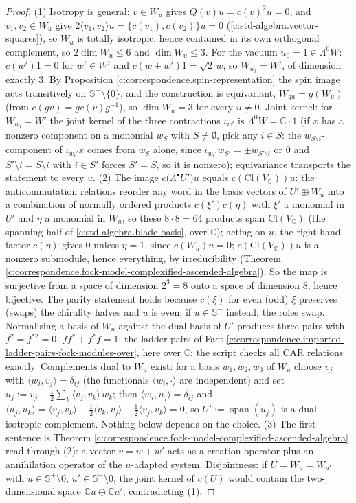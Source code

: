 \documentclass[11pt]{article}
\theoremstyle{definition}
\theoremstyle{plain}
\providecommand{\C}{}\renewcommand{\C}{\mathbb{C}}
\providecommand{\CS}{}\renewcommand{\CS}{{\mathbb{S}^{+}}}
\providecommand{\CSm}{}\renewcommand{\CSm}{{\mathbb{S}^{-}}}
\providecommand{\Cl}{}\renewcommand{\Cl}{\mathrm{Cl}}
\providecommand{\ip}{}\renewcommand{\ip}[2]{\langle #1, #2\rangle}
\begin{document}
\begin{proof}
(1) Isotropy is general: $v \in W_u$ gives $Q(v)u = c(v)^2u = 0$, and $v_1, v_2 \in W_u$ give $2\ip{v_1}{v_2}u = \{c(v_1), c(v_2)\}u = 0$ (\ref{c:std-algebra.vector-squares}), so $W_u$ is totally isotropic, hence contained in its own orthogonal complement, so $2\dim W_u \le 6$ and $\dim W_u \le 3$. For the vacuum $u_0 = 1 \in \Lambda^0 W$: $c(w')1 = 0$ for $w' \in W'$ and $c(w+w')1 = \sqrt2\,w$, so $W_{u_0} = W'$, of dimension exactly $3$. By Proposition \ref{c:correspondence.spin-representation} the spin image acts transitively on $\CS\setminus\{0\}$, and the construction is equivariant, $W_{gu} = g(W_u)$ (from $c(gv) = g c(v) g^{-1}$), so $\dim W_u = 3$ for every $u \neq 0$. Joint kernel: for $W_{u_0} = W'$ the joint kernel of the three contractions $\iota_{w'}$ is $\Lambda^0 W = \C\cdot 1$ (if $x$ has a nonzero component on a monomial $w_S$ with $S \neq \emptyset$, pick any $i \in S$: the $w_{S\setminus i}$-component of $\iota_{w_i'}x$ comes from $w_S$ alone, since $\iota_{w_i'}w_{S'} = \pm w_{S'\setminus i}$ or $0$ and $S'\setminus i = S\setminus i$ with $i \in S'$ forces $S' = S$, so it is nonzero); equivariance transports the statement to every $u$.
(2) The image $c\bigl(\Lambda^\bullet U'\bigr)u$ equals $c(\Cl(V_\C))u$: the anticommutation relations reorder any word in the basis vectors of $U' \oplus W_u$ into a combination of normally ordered products $c(\xi')c(\eta)$ with $\xi'$ a monomial in $U'$ and $\eta$ a monomial in $W_u$, so these $8\cdot 8 = 64$ products span $\Cl(V_\C)$ (the spanning half of \ref{c:std-algebra.blade-basis}, over $\C$); acting on $u$, the right-hand factor $c(\eta)$ gives $0$ unless $\eta = 1$, since $c(W_u)u = 0$; $c(\Cl(V_\C))u$ is a nonzero submodule, hence everything, by irreducibility (Theorem \ref{c:correspondence.fock-model-complexified-ascended-algebra}). So the map is surjective from a space of dimension $2^3 = 8$ onto a space of dimension $8$, hence bijective. The parity statement holds because $c(\xi)$ for even (odd) $\xi$ preserves (swaps) the chirality halves and $u$ is even; if $u \in \CSm$ instead, the roles swap. Normalising a basis of $W_u$ against the dual basis of $U'$ produces three pairs with $f^2 = f^{*2} = 0$, $ff^* + f^*f = 1$: the ladder pairs of Fact \ref{c:correspondence.imported-ladder-pairs-fock-modules-over}, here over $\C$; the script checks all CAR relations exactly. Complements dual to $W_u$ exist: for a basis $w_1, w_2, w_3$ of $W_u$ choose $v_j$ with $\ip{w_i}{v_j} = \delta_{ij}$ (the functionals $\ip{w_i}{\cdot}$ are independent) and set $u_j := v_j - \tfrac12\sum_k \ip{v_j}{v_k}\,w_k$; then $\ip{w_i}{u_j} = \delta_{ij}$ and $\ip{u_j}{u_k} = \ip{v_j}{v_k} - \tfrac12\ip{v_k}{v_j} - \tfrac12\ip{v_j}{v_k} = 0$, so $U' := \operatorname{span}(u_j)$ is a dual isotropic complement. Nothing below depends on the choice.
(3) The first sentence is Theorem \ref{c:correspondence.fock-model-complexified-ascended-algebra} read through (2): a vector $v = w + w'$ acts as a creation operator plus an annihilation operator of the $u$-adapted system. Disjointness: if $U = W_{u} = W_{u'}$ with $u \in \CS\setminus 0$, $u' \in \CSm\setminus 0$, the joint kernel of $c(U)$ would contain the two-dimensional space $\C u \oplus \C u'$, contradicting (1).


\end{proof}
\end{document}
